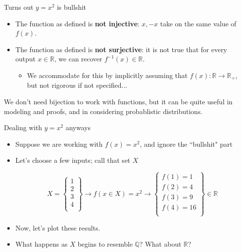 \documentclass[10pt]{beamer}
\begin{document}
\begin{frame}{Turns out $y=x^2$ is bullshit}
    \begin{itemize}
        \item The function as defined is \textbf{not injective}: $x,-x$ take on the same value of $f(x)$. \pause
        \item The function as defined is \textbf{not surjective}: it is not true that for every output $x \in \mathbb{R}$, we can recover $f^{-1}(x) \in \mathbb{R}$.
        \begin{itemize}
            \item We accommodate for this by implicitly assuming that $f(x) : \mathbb{R} \rightarrow \mathbb{R}_+$, but not rigorous if not specified...
        \end{itemize}
    \end{itemize}

We don't need bijection to work with functions, but it can be quite useful in modeling and proofs, and in considering probablistic distributions.
\end{frame}

\begin{frame}{Dealing with $y=x^2$ anyways}

\begin{itemize}
    \item Suppose we are working with $f(x) = x^2$, and ignore the ``bullshit" part
    \item Let's choose a few inputs; call that set $X$

\[X = \begin{Bmatrix}
    1 \\
    2 \\
    3 \\
    4 \\
   
\end{Bmatrix} \rightarrow f(x\in X) = x^2 \rightarrow 
\begin{Bmatrix}
    f(1) = 1 \\
    f(2) = 4 \\
    f(3) = 9 \\
    f(4) = 16 \\
    
\end{Bmatrix} \in \mathbb{R}\]
\item Now, let's plot these results.
\item What happens as $X$ begins to resemble $\mathbb{Q}$? What about $\mathbb{R}$?
\end{itemize}

\end{frame}
\end{document}
